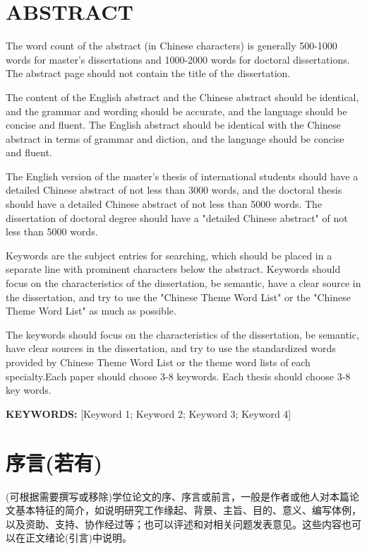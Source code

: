\chapter*{ABSTRACT}
The word count of the abstract (in Chinese characters) is generally 500-1000 words for master's dissertations and 1000-2000 words for doctoral dissertations.
The abstract page should not contain the title of the dissertation.

The content of the English abstract and the Chinese abstract should be identical, and the grammar and wording should be accurate, and the language should be concise and fluent.
The English abstract should be identical with the Chinese abstract in terms of grammar and diction, and the language should be concise and fluent.

The English version of the master's thesis of international students should have a detailed Chinese abstract of not less than 3000 words, and the doctoral thesis should have a detailed Chinese abstract of not less than 5000 words.
The dissertation of doctoral degree should have a "detailed Chinese abstract" of not less than 5000 words.

Keywords are the subject entries for searching, which should be placed in a separate line with prominent characters below the abstract.
Keywords should focus on the characteristics of the dissertation, be semantic, have a clear source in the dissertation, and try to use the "Chinese Theme Word List" or the "Chinese Theme Word List" as much as possible.

The keywords should focus on the characteristics of the dissertation, be semantic, have clear sources in the dissertation, and try to use the standardized words provided by Chinese Theme Word List or the theme word lists of each specialty.Each paper should choose 3-8 keywords.
Each thesis should choose 3-8 key words.


{\bfseries KEYWORDS: }[Keyword 1; Keyword 2; Keyword 3; Keyword 4]




\chapter*{序言(若有)}
(可根据需要撰写或移除)学位论文的序、序言或前言，一般是作者或他人对本篇论文基本特征的简介，如说明研究工作缘起、背景、主旨、目的、意义、编写体例，以及资助、支持、协作经过等；也可以评述和对相关问题发表意见。这些内容也可以在正文绪论(引言)中说明。







